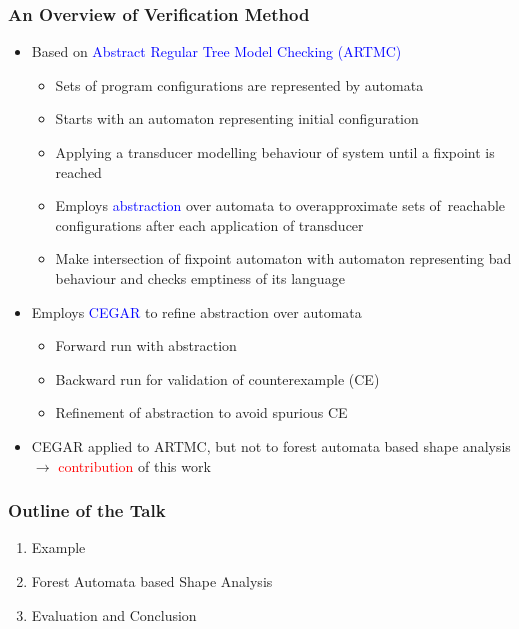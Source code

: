 \documentclass{beamer}
\newcommand{\hlbl}[1]{\textcolor{blue}{#1}}
\newcommand{\hlrd}[1]{\textcolor{red}{#1}}
\begin{document}
\begin{frame}
  \frametitle{An Overview of Verification Method}
   \begin{itemize}
	   \item Based on \hlbl{Abstract Regular Tree Model Checking (ARTMC)} 
		\begin{itemize}
			\item Sets of program configurations are represented by automata
			\item Starts with an automaton representing initial configuration
			\item Applying a transducer modelling behaviour of system until a fixpoint is reached
			\item Employs \hlbl{abstraction} over automata to overapproximate sets of~reachable configurations
				after each application of transducer
			\item Make intersection of fixpoint automaton with automaton representing bad behaviour and
				checks emptiness of its language
		\end{itemize}
		\pause
	   \item Employs \hlbl{CEGAR} to refine abstraction over automata
		   \begin{itemize}
			    \item Forward run with abstraction
			    \item Backward run for validation of counterexample (CE)
				\item Refinement of abstraction to avoid spurious CE
		   \end{itemize}
		\pause
	   \item CEGAR applied to ARTMC, but not to forest automata
		   based shape analysis $\rightarrow$ \hlrd{contribution} of this work
  \end{itemize}
\end{frame}

\begin{frame}
\frametitle{Outline of the Talk}

	\begin{enumerate}
		\item Example
		\item Forest Automata based Shape Analysis
		\item Evaluation and Conclusion
	\end{enumerate}

\end{frame}
\end{document}
